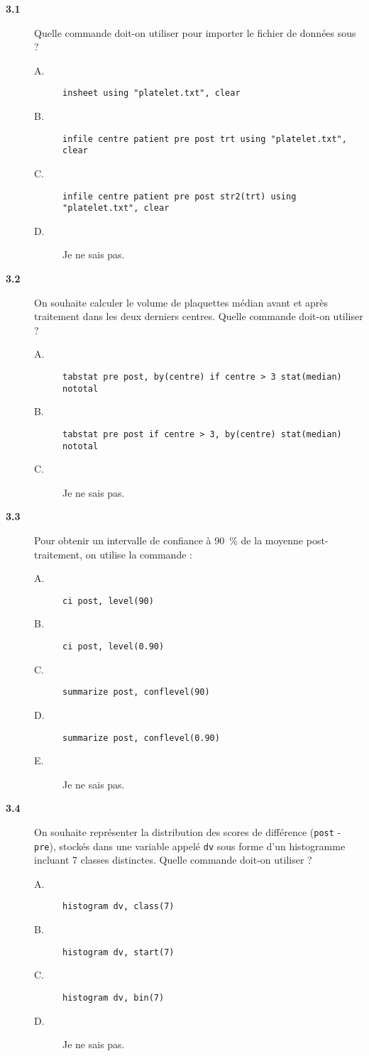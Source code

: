 \begin{description}
\item[\bf 3.1] Quelle commande doit-on utiliser pour importer le fichier de
  données sous \Stata ? 
  \begin{description}
  \item[A.] \verb|insheet using "platelet.txt", clear|
  \item[B.] \verb|infile centre patient pre post trt using "platelet.txt", clear|
  \item[C.] \verb|infile centre patient pre post str2(trt) using "platelet.txt", clear|
  \item[D.] Je ne sais pas.
  \end{description}
\item[\bf 3.2] On souhaite calculer le volume de plaquettes médian avant et
  après traitement dans les deux derniers centres. Quelle commande doit-on
  utiliser ? 
  \begin{description}
  \item[A.] \verb|tabstat pre post, by(centre) if centre > 3 stat(median) nototal|
  \item[B.] \verb|tabstat pre post if centre > 3, by(centre) stat(median) nototal|
  \item[C.] Je ne sais pas.
  \end{description}
\item[\bf 3.3] Pour obtenir un intervalle de confiance à 90~\% de la moyenne
  post-traitement, on utilise la commande : 
  \begin{description}
  \item[A.] \verb|ci post, level(90)|
  \item[B.] \verb|ci post, level(0.90)|
  \item[C.] \verb|summarize post, conflevel(90)|
  \item[D.] \verb|summarize post, conflevel(0.90)|
  \item[E.] Je ne sais pas.
  \end{description}
\item[\bf 3.4] On souhaite représenter la distribution des scores de
  différence (\texttt{post} - \texttt{pre}), stockés dans une variable
  appelé \texttt{dv} sous forme d'un histogramme incluant 7 classes
  distinctes. Quelle commande doit-on utiliser ? 
  \begin{description}
  \item[A.] \verb|histogram dv, class(7)|
  \item[B.] \verb|histogram dv, start(7)|
  \item[C.] \verb|histogram dv, bin(7)|
  \item[D.] Je ne sais pas.
  \end{description}
\end{description}

